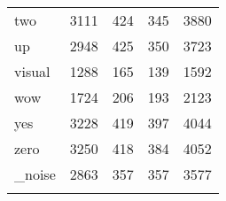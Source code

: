 \begin{table}[ht!]
\begin{center}
\begin{tabular}{ M{2cm}  M{1.75cm}  M{1.75cm}  M{1.75cm}  M{1.75cm} }
two & 3111 & 424 & 345 & 3880 \\
up & 2948 & 425 & 350 & 3723 \\
visual & 1288 & 165 & 139 & 1592 \\
wow & 1724 & 206 & 193 & 2123 \\
yes & 3228 & 419 & 397 & 4044 \\
zero & 3250 & 418 & 384 & 4052 \\
\_noise\footnotemark & 2863 & 357 & 357 & 3577 \\
\bottomrule
\label{tab:exp_dataset_all_labels}
\end{tabular}
\end{center}
\vspace{-4mm}
\end{table}
\FloatBarrier
\noindent
{}